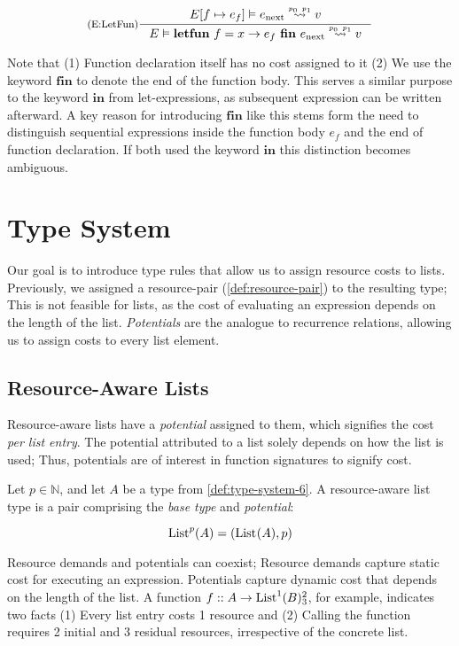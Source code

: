 \[
   \inference[(E:LetFun)]
   {\evals{\envaugment{E}{f}{e_f}}{e_{\text{next}}}{v}{p_0}{p_1}}
   {\evals{E}{\letFun{f}{x}{e_f}{e_{\text{next}}}}{v}{p_0}{p_1}}
\]

Note that (1) Function declaration itself has no cost assigned to it (2) We use the keyword \(\textbf{fin}\) to denote the end of the function body. This serves a similar purpose to the keyword \(\textbf{in}\) from let-expressions, as subsequent expression can be written afterward. A key reason for introducing \(\textbf{fin}\) like this stems form the need to distinguish sequential expressions inside the function body \(e_f\) and the end of function declaration. If both used the keyword \(\textbf{in}\) this distinction becomes ambiguous. 


\section{Type System}

Our goal is to introduce type rules that allow us to assign resource costs to lists. Previously, we assigned a resource-pair (\cref{def:resource-pair}) to the resulting type; This is not feasible for lists, as the cost of evaluating an expression depends on the length of the list. \emph{Potentials} are the analogue to recurrence relations, allowing us to assign costs to every list element. 

\subsection{Resource-Aware Lists}\label{sec:resource-aware-lists}

Resource-aware lists have a \emph{potential} assigned to them, which signifies the cost \emph{per list entry}. The potential attributed to a list solely depends on how the list is used; Thus, potentials are of interest in function signatures to signify cost. 

\begin{definition}\label{def:ra-list}
   Let \(p \in \mathbb{N}\), and let \(A\) be a type from \cref{def:type-system-6}. A resource-aware list type is a pair comprising the \emph{base type} and \emph{potential}:

   \[
      \text{List}^{p}(A) = (\text{List}^{}(A), p)
   \]
\end{definition}

\begin{remark}
   Resource demands and potentials can coexist; Resource demands capture static cost for executing an expression. Potentials capture dynamic cost that depends on the length of the list. A function \(f :: A \to \text{List}^{1}(B) ^{2}_{3}\), for example, indicates two facts (1) Every list entry costs 1 resource and (2) Calling the function requires 2 initial and 3 residual resources, irrespective of the concrete list.
\end{remark}

